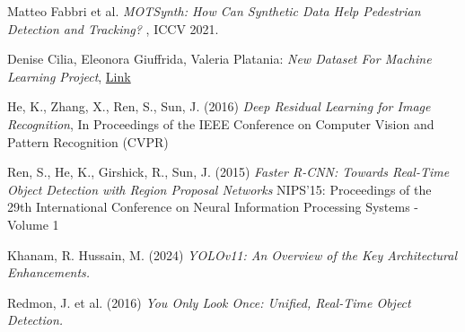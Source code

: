 \documentclass[12pt]{article}
\begin{document}
\begin{thebibliography}{9}

Matteo Fabbri et al. 
\textit{MOTSynth: How Can Synthetic Data Help Pedestrian Detection and Tracking?
},
ICCV 2021.

Denise Cilia, Eleonora Giuffrida, Valeria Platania:
\textit{New Dataset For Machine Learning Project},
\href{https://app.roboflow.com/test-hqhgt/new-dataset-for-ml-project/5}{Link}

He, K., Zhang, X., Ren, S., Sun, J. (2016)
\textit{Deep Residual Learning for Image Recognition},
In Proceedings of the IEEE Conference on Computer Vision and Pattern Recognition (CVPR)

Ren, S., He, K., Girshick, R., Sun, J. (2015)
\textit{Faster R-CNN: Towards Real-Time Object Detection with Region Proposal Networks}
NIPS'15: Proceedings of the 29th International Conference on Neural Information Processing Systems - Volume 1

Khanam, R. Hussain, M. (2024) 
\textit{YOLOv11: An Overview of the Key Architectural Enhancements.}

Redmon, J. et al. (2016)
\textit{You Only Look Once: Unified, Real-Time Object Detection.}

\end{thebibliography}
\end{document}
